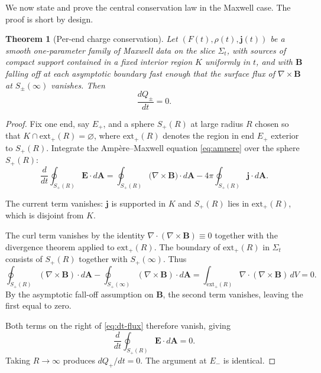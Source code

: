 \documentclass[aps,prd,onecolumn,nofootinbib,superscriptaddress]{revtex4-2}
\newtheorem{theorem}{Theorem}
\begin{document}
We now state and prove the central conservation law in the Maxwell case. The proof is short by design.

\begin{theorem}[Per-end charge conservation]
\label{thm:Q-conservation}
Let $(F(t),\rho(t),\bm{j}(t))$ be a smooth one-parameter family of Maxwell data on the slice $\Sigma_t$, with sources of compact support contained in a fixed interior region $K$ uniformly in $t$, and with $\bm{B}$ falling off at each asymptotic boundary fast enough that the surface flux of $\nabla\times\bm{B}$ at $S_\pm(\infty)$ vanishes. Then
\begin{equation}
\label{eq:Q-conservation}
\frac{dQ_\pm}{dt} = 0.
\end{equation}
\end{theorem}

\begin{proof}
Fix one end, say $E_+$, and a sphere $S_+(R)$ at large radius $R$ chosen so that $K \cap \mathrm{ext}_+(R) = \varnothing$, where $\mathrm{ext}_+(R)$ denotes the region in end $E_+$ exterior to $S_+(R)$. Integrate the Amp\`ere--Maxwell equation \eqref{eq:ampere} over the sphere $S_+(R)$:
\begin{equation}
\label{eq:dt-flux}
\frac{d}{dt}\oint_{S_+(R)} \bm{E}\cdot d\bm{A}
= \oint_{S_+(R)} \big(\nabla\times \bm{B}\big)\cdot d\bm{A}
- 4\pi \oint_{S_+(R)} \bm{j}\cdot d\bm{A}.
\end{equation}

The current term vanishes: $\bm{j}$ is supported in $K$ and $S_+(R)$ lies in $\mathrm{ext}_+(R)$, which is disjoint from $K$.

The curl term vanishes by the identity $\nabla\cdot(\nabla\times\bm{B})\equiv 0$ together with the divergence theorem applied to $\mathrm{ext}_+(R)$. The boundary of $\mathrm{ext}_+(R)$ in $\Sigma_t$ consists of $S_+(R)$ together with $S_+(\infty)$. Thus
\begin{equation}
\oint_{S_+(R)}(\nabla\times\bm{B})\cdot d\bm{A}
- \oint_{S_+(\infty)}(\nabla\times\bm{B})\cdot d\bm{A}
= \int_{\mathrm{ext}_+(R)} \nabla\cdot(\nabla\times\bm{B})\, dV = 0.
\end{equation}
By the asymptotic fall-off assumption on $\bm{B}$, the second term vanishes, leaving the first equal to zero.

Both terms on the right of \eqref{eq:dt-flux} therefore vanish, giving
\begin{equation}
\frac{d}{dt}\oint_{S_+(R)} \bm{E}\cdot d\bm{A} = 0.
\end{equation}
Taking $R\to\infty$ produces $dQ_+/dt = 0$. The argument at $E_-$ is identical.
\end{proof}
\end{document}
